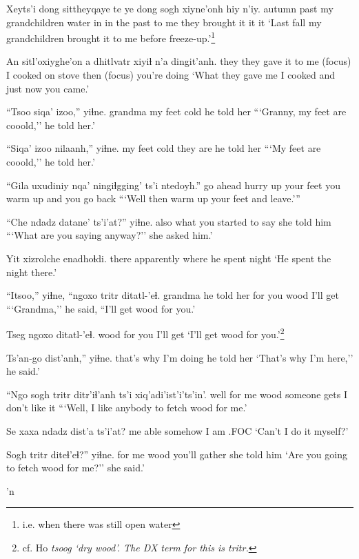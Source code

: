 \documentclass[12pt]{article}
\begin{document}
\gll Xeyts'i dong sittheyqaye te ye dong sogh xiyne'onh hiy n'iy.
autumn past {my grandchildren} water in {in the past} {to me} {they brought it} it it
\glt `Last fall my grandchildren brought it to me before freeze-up.'\footnote{i.e. when there was still open water}
\glend

\gll An sitl'oxiyghe'on a dhitlvatr xiyiɬ n'a dingit'anh.
they {they gave it to me} {(focus)} {I cooked on stove} then {(focus)} {you're doing}
\glt `What they gave me I cooked and just now you came.'
\glend

\gll ``Tsoo siqa' izoo,'' yiɬne.
grandma {my feet} cold {he told her}
\glt ```Granny, my feet are cooold,'' he told her.'
\glend

\gll ``Siqa' izoo nilaanh,'' yiɬne.
{my feet} cold {they are} {he told her}
\glt ```My feet are cooold,'' he told her.'
\glend

\gll ``Gila uxudiniy nqa' ningiɬgging' ts'i ntedoyh.''
{go ahead} {hurry up} {your feet} {you warm up} and {you go back}
\glt ```Well then warm up your feet and leave.'''
\glend

\gll ``Che ndadz datane' ts'i'at?'' yiɬne.
also what {you started to say} {} {she told him}
\glt ```What are you saying anyway?'' she asked him.'
\glend

\gll Yit xizrolche enadhoɬdi.
there apparently {where he spent night}
\glt `He spent the night there.'
\glend

\gll ``Itsoo,'' yiɬne, ``ngoxo tritr ditatl-'eɬ.
grandma {he told her} {for you} wood {I'll get}
\glt ```Grandma,'' he said, ``I'll get wood for you.'
\glend

\gll Tseg ngoxo ditatl-'eɬ.
wood {for you} {I'll get}
\glt `I'll get wood for you.'\footnote{cf. Ho \em tsoog \em `dry wood'. The DX term for this is \em tritr.}
\glend

\gll Ts'an-go dist'anh,'' yiɬne.
{that's why} {I'm doing} {he told her}
\glt `That's why I'm here,'' he said.'
\glend

\gll ``Ngo sogh tritr ditr'iɬ'anh ts'i xiq'adi'ist'i'ts'in'.
well {for me} wood {someone gets} {} {I don't like it}
\glt ```Well, I like anybody to fetch wood for me.'
\glend

\gll Se xaxa ndadz dist'a ts'i'at? 
me able somehow {I am} {}.FOC
\glt `Can't I do it myself?'
\glend

\gll Sogh tritr diteɬ'eɬ?'' yiɬne.
{for me} wood {you'll gather} {she told him}
\glt `Are you going to fetch wood for me?'' she said.'
\glend

'n
\end{document}
